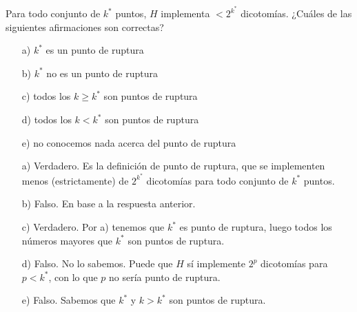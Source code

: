 \documentclass[12pt]{article}
\theoremstyle{definition}
\begin{document}
\begin{pregunta}
Para todo conjunto de $k^*$ puntos, $H$ implementa $<2^{k^*}$ dicotomías. ¿Cuáles de las siguientes afirmaciones son correctas?
\begin{enumerate}
\item[a)] $k^*$ es un punto de ruptura
\item[b)] $k^*$ no es un punto de ruptura
\item[c)] todos los $k \geqslant k^*$ son puntos de ruptura
\item[d)] todos los $k < k^*$ son puntos de ruptura
\item[e)] no conocemos nada acerca del punto de ruptura
\end{enumerate}

\begin{enumerate}
\item[a)] Verdadero. Es la definición de punto de ruptura, que se implementen menos (estrictamente) de $2^{k^*}$ dicotomías para todo conjunto de $k^*$ puntos.
\item[b)] Falso. En base a la respuesta anterior.
\item[c)] Verdadero. Por a) tenemos que $k^*$ es punto de ruptura, luego todos los números mayores que $k^*$ son puntos de ruptura.
\item[d)] Falso. No lo sabemos. Puede que $H$ sí implemente $2^p$ dicotomías para $p<k^*$, con lo que $p$ no sería punto de ruptura.
\item[e)] Falso. Sabemos que $k^*$ y $k>k^*$ son puntos de ruptura.
\end{enumerate}

\end{pregunta}
\end{document}
